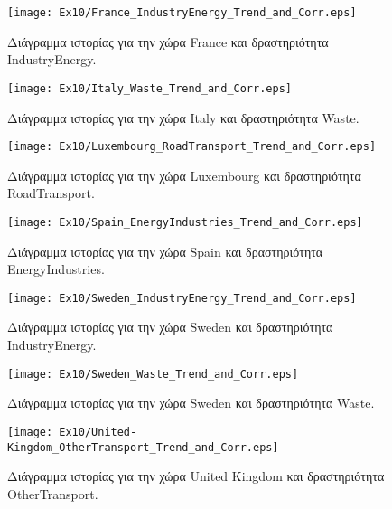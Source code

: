 \documentclass[11pt]{scrartcl} %
\begin{document}
\begin{figure}[H]

	\centering
	\texttt{[image: Ex10/France\_IndustryEnergy\_Trend\_and\_Corr.eps]}	
\caption{Διάγραμμα ιστορίας για την χώρα France και δραστηριότητα IndustryEnergy.}
\label{fig:z103} 
\end{figure}


\begin{figure}[H]

	\centering
	\texttt{[image: Ex10/Italy\_Waste\_Trend\_and\_Corr.eps]}	
\caption{Διάγραμμα ιστορίας για την χώρα Italy και δραστηριότητα Waste.}
\label{fig:z104} 
\end{figure}


\begin{figure}[H]
 
	\centering
	\texttt{[image: Ex10/Luxembourg\_RoadTransport\_Trend\_and\_Corr.eps]}	
\caption{Διάγραμμα ιστορίας για την χώρα Luxembourg και δραστηριότητα RoadTransport.}
\label{fig:z105}
\end{figure}


\begin{figure}[H]

	\centering
	\texttt{[image: Ex10/Spain\_EnergyIndustries\_Trend\_and\_Corr.eps]}	
\caption{Διάγραμμα ιστορίας για την χώρα Spain και δραστηριότητα EnergyIndustries.}
\label{fig:z106} 
\end{figure}


\begin{figure}[H]

	\centering
	\texttt{[image: Ex10/Sweden\_IndustryEnergy\_Trend\_and\_Corr.eps]}	
\caption{Διάγραμμα ιστορίας για την χώρα Sweden και δραστηριότητα IndustryEnergy.}
\label{fig:z107} 
\end{figure}


\begin{figure}[H]

	\centering
	\texttt{[image: Ex10/Sweden\_Waste\_Trend\_and\_Corr.eps]}	
\caption{Διάγραμμα ιστορίας για την χώρα Sweden και δραστηριότητα Waste.}
\label{fig:z108} 
\end{figure}


\begin{figure}[H]

	\centering
	\texttt{[image: Ex10/United-Kingdom\_OtherTransport\_Trend\_and\_Corr.eps]}	
\caption{Διάγραμμα ιστορίας για την χώρα United Kingdom και δραστηριότητα OtherTransport.}
\label{fig:z109} 
\end{figure}
\end{document}
